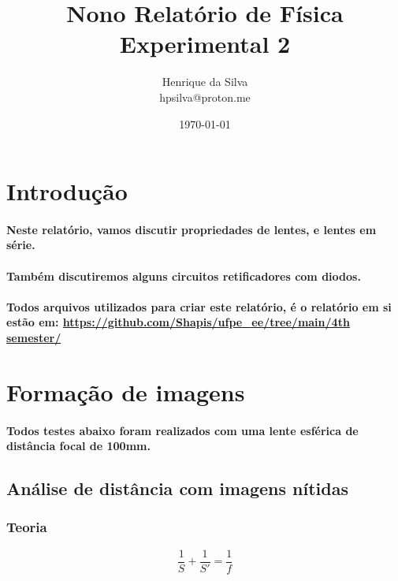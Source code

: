 \documentclass[12pt,twoside, a4paper, twocolumn]{article}
\title{Nono  Relatório de Física Experimental 2}
\author{Henrique da Silva \\ hpsilva@proton.me}
\date{\today}
\begin{document}
\maketitle
{}
\newpage
\tableofcontents
\newpage

\section{Introdução}

\paragraph*{Neste relatório, vamos discutir propriedades de lentes, e lentes em série.}

\paragraph*{Também discutiremos alguns circuitos retificadores com diodos.}

\paragraph*{Todos arquivos utilizados para criar este relatório, é o relatório em si estão em:  \url{https://github.com/Shapis/ufpe_ee/tree/main/4th semester/}}


\section{Formação de imagens}

\paragraph*{Todos testes abaixo foram realizados com uma lente esférica de distância focal de 100mm.}

\subsection{Análise de distância com imagens nítidas}

\subsubsection{Teoria}

\begin{equation}
  \frac{1}{S} + \frac{1}{S'} = \frac{1}{f}
\end{equation}
\end{document}
